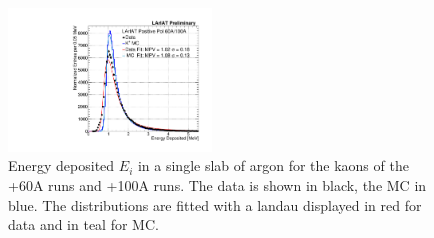 \begin{figure}[htb]
\centering
\includegraphics[width=0.48\textwidth]{Chapter-5/Images/KaonEdep.pdf}
\caption[]{ Energy deposited  $E_{i}$ in a single slab of argon for the kaons of the +60A runs and +100A runs.  The data is shown in black, the MC in blue. The distributions are fitted with a landau displayed in red for data and in teal for MC. } \label{fig:EnergyDepositedK}
\end{figure}





